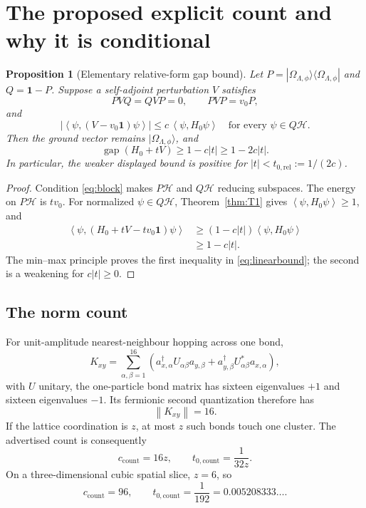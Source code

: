 \documentclass[11pt]{article}
\newtheorem{proposition}[theorem]{Proposition}
\theoremstyle{remark}
\newcommand{\Hh}{\mathcal H}
\newcommand{\id}{\mathbf 1}
\newcommand{\gap}{\operatorname{gap}}
\newcommand{\norm}[1]{\left\lVert #1\right\rVert}
\newcommand{\ip}[2]{\left\langle #1,#2\right\rangle}
\begin{document}
\section{The proposed explicit count and why it is conditional}

\begin{proposition}[Elementary relative-form gap bound]
\label{prop:relative}
Let $P=|\Omega_{\Lambda,\phi}\rangle
\langle\Omega_{\Lambda,\phi}|$ and $Q=\id-P$.  Suppose a self-adjoint
perturbation $V$ satisfies
\[
 PVQ=QVP=0,\qquad PVP=v_0P,
\tag{6.1}\label{eq:block}
\]
and
\[
 \left|
 \ip{\psi}{(V-v_0\id)\psi}
 \right|
 \leq c\,\ip{\psi}{H_0\psi}
 \quad\text{for every }\psi\in Q\Hh.
\tag{6.2}\label{eq:formbound}
\]
Then the ground vector remains $|\Omega_{\Lambda,\phi}\rangle$, and
\[
 \gap(H_0+tV)\geq1-c|t|
 \geq1-2c|t|.
\tag{6.3}\label{eq:linearbound}
\]
In particular, the weaker displayed bound is positive for
$|t|<t_{0,\mathrm{rel}}:=1/(2c)$.
\end{proposition}

\begin{proof}
Condition \eqref{eq:block} makes $P\Hh$ and $Q\Hh$ reducing subspaces.
The energy on $P\Hh$ is $tv_0$.  For normalized $\psi\in Q\Hh$,
Theorem~\ref{thm:T1} gives
$\ip{\psi}{H_0\psi}\geq1$, and
\[
\begin{aligned}
 \ip{\psi}{(H_0+tV-tv_0\id)\psi}
 &\geq
 (1-c|t|)\ip{\psi}{H_0\psi}\\
 &\geq1-c|t|.
\end{aligned}
\]
The min--max principle proves the first inequality in
\eqref{eq:linearbound}; the second is a weakening for $c|t|\geq0$.
\end{proof}

\subsection{The norm count}

For unit-amplitude nearest-neighbour hopping across one bond,
\[
 K_{xy}=\sum_{\alpha,\beta=1}^{16}
 \left(a_{x,\alpha}^\dagger U_{\alpha\beta}a_{y,\beta}
 +a_{y,\beta}^\dagger U_{\alpha\beta}^*a_{x,\alpha}\right),
\tag{6.4}\label{eq:hopping}
\]
with $U$ unitary, the one-particle bond matrix has sixteen eigenvalues
$+1$ and sixteen eigenvalues $-1$.  Its fermionic second quantization
therefore has
\[
 \norm{K_{xy}}=16.
\tag{6.5}\label{eq:bondnorm}
\]
If the lattice coordination is $z$, at most $z$ such bonds touch one
cluster.  The advertised count is consequently
\[
 c_{\mathrm{count}}=16z,\qquad
 t_{0,\mathrm{count}}=\frac1{32z}.
\tag{6.6}\label{eq:count}
\]
On a three-dimensional cubic spatial slice, $z=6$, so
\[
 c_{\mathrm{count}}=96,\qquad
 t_{0,\mathrm{count}}=\frac1{192}
 =0.005208333\ldots .
\tag{6.7}\label{eq:count3d}
\]
\end{document}
